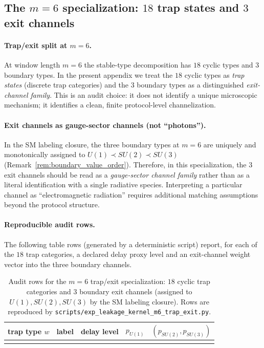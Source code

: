 \subsection{The \texorpdfstring{$m=6$}{m=6} specialization: \texorpdfstring{$18$}{18} trap states and \texorpdfstring{$3$}{3} exit channels}
\label{subsec:m6_trap_exit}

\paragraph{Trap/exit split at \texorpdfstring{$m=6$}{m=6}.}
\AuditTag At window length $m=6$ the stable-type decomposition has $18$ cyclic types and $3$ boundary types.
In the present appendix we treat the $18$ cyclic types as \emph{trap states} (discrete trap categories) and the $3$ boundary types as a distinguished \emph{exit-channel family}.
This is an audit choice: it does not identify a unique microscopic mechanism; it identifies a clean, finite protocol-level channelization.

\paragraph{Exit channels as gauge-sector channels (not ``photons'').}
\AuditTag In the SM labeling closure, the three boundary types at $m=6$ are uniquely and monotonically assigned to $U(1)\prec SU(2)\prec SU(3)$ (Remark~\ref{rem:boundary_value_order}).
Therefore, in this specialization, the $3$ exit channels should be read as a \emph{gauge-sector channel family} rather than as a literal identification with a single radiative species.
Interpreting a particular channel as ``electromagnetic radiation'' requires additional matching assumptions beyond the protocol structure.

\paragraph{Reproducible audit rows.}
\AuditTag The following table rows (generated by a deterministic script) report, for each of the $18$ trap categories, a declared delay proxy level and an exit-channel weight vector into the three boundary channels.
\begin{table}[t]
\centering
\scriptsize
\setlength{\tabcolsep}{6pt}
\renewcommand{\arraystretch}{1.15}
\begin{tabular}{l l r r r}
\toprule
trap type $w$ & label & delay level & $p_{U(1)}$ & $(p_{SU(2)},p_{SU(3)})$ \\
\midrule
%
\\
\bottomrule
\end{tabular}
\caption{Audit rows for the $m=6$ trap/exit specialization: $18$ cyclic trap categories and $3$ boundary exit channels (assigned to $U(1),SU(2),SU(3)$ by the SM labeling closure). Rows are reproduced by \texttt{scripts/exp\_leakage\_kernel\_m6\_trap\_exit.py}.}
\label{tab:leakage_kernel_m6_trap_exit}
\end{table}

%

